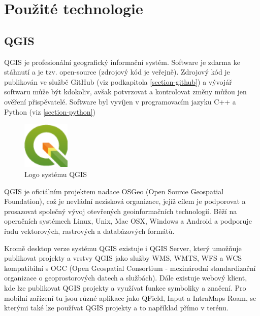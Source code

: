 \chapter{Použité technologie}
\label{4-technologie}

\section{QGIS}

QGIS je profesionální geografický informační systém.
Software je zdarma ke stáhnutí a je tzv. open-source (zdrojový kód je veřejně).
Zdrojový kód je publikován ve službě GitHub (viz podkapitola \ref{section-github})
a vývojář softwaru může být kdokoliv, avšak potvrzovat a kontrolovat změny můžou jen ověření
přispěvatelé. Software byl vyvíjen v programovacím jazyku C++ a Python (viz \ref{section-python})

\begin{figure}[H] \centering
    \includegraphics[width=64pt]{./pictures/qgis-logo.png}
    \caption[Logo systému QGIS]{Logo systému QGIS \cite{qgis}}
	\label{fig:qgis-logo}                                
\end{figure}

QGIS je oficiálním projektem nadace OSGeo (Open Source Geospatial Foundation), což je nevládní 
nezisková organizace, jejíž cílem je podporovat a prosazovat společný vývoj otevřených geoinformačních
technologií. Běží na operačních systémech Linux, Unix, Mac OSX, Windows a Android a podporuje
řadu vektorových, rastrových a databázových formátů.

Kromě desktop verze systému QGIS existuje i QGIS Server, který umožňuje publikovat projekty a vrstvy
QGIS jako služby WMS, WMTS, WFS a WCS kompatibilní s OGC (Open Geospatial Consortium - mezinárodní standardizační organizace
o geoprostorových datech a službách). Dále existuje webový klient, kde lze publikovat
QGIS projekty a využívat funkce symboliky a značení. Pro mobilní zařízení tu jsou
různé aplikace jako QField, Input a IntraMaps Roam, se kterými také lze používat QGIS projekty a to 
například přímo v terénu. 


